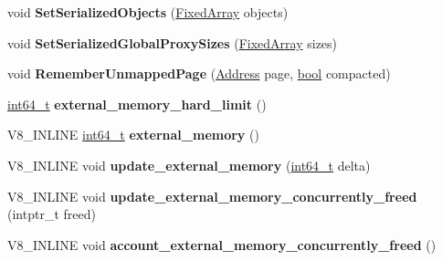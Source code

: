 \begin{DoxyCompactItemize}
\mbox{\label{classv8_1_1internal_1_1Heap_a37930f605d7e38ccafbcb859a57342de}} 
void {\bfseries Set\+Serialized\+Objects} (\mbox{\hyperlink{classv8_1_1internal_1_1FixedArray}{Fixed\+Array}} objects)
\item 
\mbox{\label{classv8_1_1internal_1_1Heap_a97f70713db53362c932252d51d555b55}} 
void {\bfseries Set\+Serialized\+Global\+Proxy\+Sizes} (\mbox{\hyperlink{classv8_1_1internal_1_1FixedArray}{Fixed\+Array}} sizes)
\item 
\mbox{\label{classv8_1_1internal_1_1Heap_a58f38e94ccc5635ac625cb068959ca9e}} 
void {\bfseries Remember\+Unmapped\+Page} (\mbox{\hyperlink{classuintptr__t}{Address}} page, \mbox{\hyperlink{classbool}{bool}} compacted)
\item 
\mbox{\label{classv8_1_1internal_1_1Heap_a386c8022b2b01d5b4aa8fb7d46e16fc2}} 
\mbox{\hyperlink{classint64__t}{int64\+\_\+t}} {\bfseries external\+\_\+memory\+\_\+hard\+\_\+limit} ()
\item 
\mbox{\label{classv8_1_1internal_1_1Heap_ad5b4a3e1f8a627faf627ac163de95979}} 
V8\+\_\+\+I\+N\+L\+I\+NE \mbox{\hyperlink{classint64__t}{int64\+\_\+t}} {\bfseries external\+\_\+memory} ()
\item 
\mbox{\label{classv8_1_1internal_1_1Heap_a8e497c567a7696318f4f432e92814c12}} 
V8\+\_\+\+I\+N\+L\+I\+NE void {\bfseries update\+\_\+external\+\_\+memory} (\mbox{\hyperlink{classint64__t}{int64\+\_\+t}} delta)
\item 
\mbox{\label{classv8_1_1internal_1_1Heap_a56fc4ab14ab27acc50541abe9f5bf660}} 
V8\+\_\+\+I\+N\+L\+I\+NE void {\bfseries update\+\_\+external\+\_\+memory\+\_\+concurrently\+\_\+freed} (intptr\+\_\+t freed)
\item 
\mbox{\label{classv8_1_1internal_1_1Heap_ab6986399dee35f2f839afc03fa072793}} 
V8\+\_\+\+I\+N\+L\+I\+NE void {\bfseries account\+\_\+external\+\_\+memory\+\_\+concurrently\+\_\+freed} ()
\item 
\mbox{\label{classv8_1_1internal_1_1Heap_ac7d84898d22e8854aa6cd627418c0555}} 

\end{DoxyCompactItemize}
